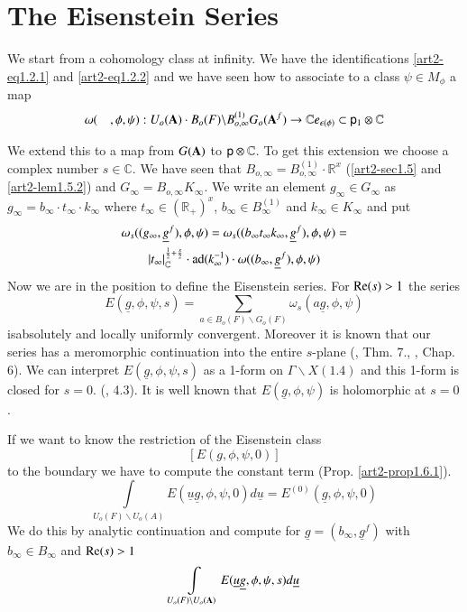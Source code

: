 \section{The Eisenstein Series}\label{art2-sec2}

We start from a cohomology class at infinity. We have the identifications \ref{art2-eq1.2.1} and \ref{art2-eq1.2.2} and we have seen how to associate to a class $\psi\in M_{\phi}$ a map
$$
\omega(\quad,\phi,\psi):U_{o}(\mathbf{A})\cdot B_{o}(F)\backslash B_{o,\infty}^{(1)}G_{o}(\mathbf{A}^{f})\to \mathbb{C} e_{\epsilon(\phi)}\subset \mathsf{p}_{1}\otimes \mathbb{C}
$$

We extend this to a map from $G(\mathbf{A})$ to $\mathsf{p}\otimes \mathbb{C}$. To get this extension we choose a complex number $s\in \mathbb{C}$. We have seen that $B_{o,\infty}=B_{o,\infty}^{(1)}\cdot \mathbb{R}^{x}$ (\ref{art2-sec1.5} and \ref{art2-lem1.5.2}) and $G_{\infty}=B_{o,\infty}K_{\infty}$. We write an element $g_{\infty}\in G_{\infty}$ as $g_{\infty}=b_{\infty}\cdot t_{\infty}\cdot k_{\infty}$ where $t_{\infty}\in (\mathbb{R}_{+})^{x}$, $b_{\infty}\in B^{(1)}_{\infty}$ and $k_{\infty}\in K_{\infty}$ and put
\begin{gather*}
\omega_{s}((g_{\infty},\underline{g}^{f}),\phi,\psi)=\omega_{s}((b_{\infty}t_{\infty}k_{\infty},\underline{g}^{f}),\phi,\psi)=\\
|t_{\infty}|_{\mathbb{C}}^{\frac{1}{2}+\frac{s}{2}}\cdot \operatorname{ad}(k_{\infty}^{-1})\cdot \omega((b_{\infty},\underline{g}^{f}),\phi,\psi)
\end{gather*}
Now we are in the position to define the Eisenstein series. For $\mathrm{Re}(s)>1$ the series
$$
E(\underline{g},\phi,\psi,s)=\sum\limits_{a\in B_{o}(F)\backslash G_{o}(F)}\omega_{s}(a\underline{g},\phi,\psi)
$$
is\pageoriginale absolutely and locally uniformly convergent. Moreover it is known that our series has a meromorphic continuation into the entire $s$-plane (\cite{art2-key9}, Thm. 7., \cite{art2-key13}, Chap. 6). We can interpret $E(\underline{g},\phi,\psi,s)$ as a 1-form on $\Gamma\backslash X(1.4)$ and this 1-form is closed for $s=0$. (\cite{art2-key8}, 4.3). It is well known that $E(\underline{g},\phi,\psi)$ is holomorphic at $s=0$.

If we want to know the restriction of the Eisenstein class 
$$
[E(g,\phi,\psi,0)]
$$ 
to the boundary we have to compute the constant term (Prop. \ref{art2-prop1.6.1}).
$$
\int\limits_{U_{o}(F)\backslash U_{o}(A)}E(\underline{u}\underline{g},\phi,\psi,0)d\underline{u}=E^{(0)}(\underline{g},\phi,\psi,0)
$$
We do this by analytic continuation and compute for $\underline{g}=(b_{\infty},\underline{g}^{f})$ with $b_{\infty}\in B_{\infty}$ and $\mathrm{Re}(s)>1$
$$
\int\limits_{U_{o}(F)\backslash U_{o}(\mathbf{A})}E(\underline{u}\underline{g},\phi,\psi,s)d\underline{u}
$$

